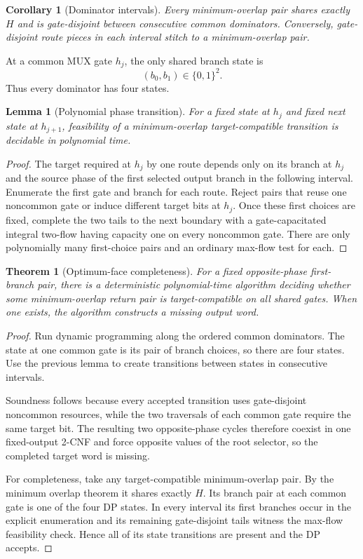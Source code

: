 \documentclass[11pt]{article}
\newtheorem{theorem}{Theorem}
\newtheorem{lemma}{Lemma}
\newtheorem{corollary}{Corollary}
\begin{document}
\begin{corollary}[Dominator intervals]
Every minimum-overlap pair shares exactly $H$ and is gate-disjoint between consecutive
common dominators.  Conversely, gate-disjoint route pieces in each interval stitch to a
minimum-overlap pair.
\end{corollary}

At a common MUX gate $h_j$, the only shared branch state is
\[
 (b_0,b_1)\in\{0,1\}^2.
\]
Thus every dominator has four states.

\begin{lemma}[Polynomial phase transition]
For a fixed state at $h_j$ and fixed next state at $h_{j+1}$, feasibility of a
minimum-overlap target-compatible transition is decidable in polynomial time.
\end{lemma}

\begin{proof}
The target required at $h_j$ by one route depends only on its branch at $h_j$ and the
source phase of the first selected output branch in the following interval.  Enumerate
the first gate and branch for each route.  Reject pairs that reuse one noncommon gate or
induce different target bits at $h_j$.  Once these first choices are fixed, complete
the two tails to the next boundary with a gate-capacitated integral two-flow having
capacity one on every noncommon gate.  There are only polynomially many first-choice
pairs and an ordinary max-flow test for each.
\end{proof}

\begin{theorem}[Optimum-face completeness]
For a fixed opposite-phase first-branch pair, there is a deterministic polynomial-time
algorithm deciding whether some minimum-overlap return pair is target-compatible on all
shared gates.  When one exists, the algorithm constructs a missing output word.
\end{theorem}

\begin{proof}
Run dynamic programming along the ordered common dominators.  The state at one common
gate is its pair of branch choices, so there are four states.  Use the previous lemma to
create transitions between states in consecutive intervals.

Soundness follows because every accepted transition uses gate-disjoint noncommon
resources, while the two traversals of each common gate require the same target bit.
The resulting two opposite-phase cycles therefore coexist in one fixed-output 2-CNF and
force opposite values of the root selector, so the completed target word is missing.

For completeness, take any target-compatible minimum-overlap pair.  By the minimum
overlap theorem it shares exactly $H$.  Its branch pair at each common gate is one of
the four DP states.  In every interval its first branches occur in the explicit
enumeration and its remaining gate-disjoint tails witness the max-flow feasibility
check.  Hence all of its state transitions are present and the DP accepts.
\end{proof}
\end{document}
